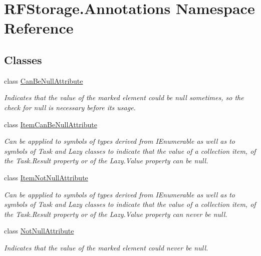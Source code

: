 \hypertarget{namespace_r_f_storage_1_1_annotations}{}\section{R\+F\+Storage.\+Annotations Namespace Reference}
\label{namespace_r_f_storage_1_1_annotations}
\subsection*{Classes}
\begin{DoxyCompactItemize}
\item 
class \mbox{\hyperlink{class_r_f_storage_1_1_annotations_1_1_can_be_null_attribute}{Can\+Be\+Null\+Attribute}}
\begin{DoxyCompactList}\small\item\em Indicates that the value of the marked element could be {\ttfamily null} sometimes, so the check for {\ttfamily null} is necessary before its usage. \end{DoxyCompactList}\item 
class \mbox{\hyperlink{class_r_f_storage_1_1_annotations_1_1_item_can_be_null_attribute}{Item\+Can\+Be\+Null\+Attribute}}
\begin{DoxyCompactList}\small\item\em Can be appplied to symbols of types derived from I\+Enumerable as well as to symbols of Task and Lazy classes to indicate that the value of a collection item, of the Task.\+Result property or of the Lazy.\+Value property can be null. \end{DoxyCompactList}\item 
class \mbox{\hyperlink{class_r_f_storage_1_1_annotations_1_1_item_not_null_attribute}{Item\+Not\+Null\+Attribute}}
\begin{DoxyCompactList}\small\item\em Can be appplied to symbols of types derived from I\+Enumerable as well as to symbols of Task and Lazy classes to indicate that the value of a collection item, of the Task.\+Result property or of the Lazy.\+Value property can never be null. \end{DoxyCompactList}\item 
class \mbox{\hyperlink{class_r_f_storage_1_1_annotations_1_1_not_null_attribute}{Not\+Null\+Attribute}}
\begin{DoxyCompactList}\small\item\em Indicates that the value of the marked element could never be {\ttfamily null}. \end{DoxyCompactList}\end{DoxyCompactItemize}
